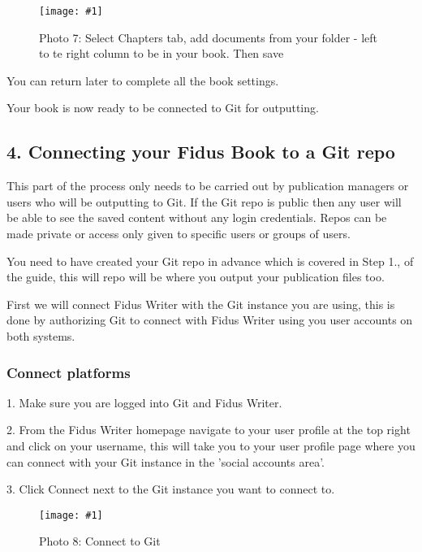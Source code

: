 \documentclass{article}
\newlength{\imgwidth}
\newcommand\scaledgraphics[2]{%
                
\settowidth{\imgwidth}{\texttt{[image: \#1]}}%
                
\setlength{\imgwidth}{\minof{\imgwidth}{#2\textwidth}}%
                
\texttt{[image: \#1]}%
                
}
\begin{document}
\begin{figure}
\scaledgraphics{a78ac1eb-85d0-4bf2-b732-94be1691dd6a.png}{1}
\caption*{Photo 7: Select Chapters tab, add documents from your folder - left to te right column to be in your book. Then save}\label{F16811081}
\end{figure}


You can return later to complete all the book settings.


Your book is now ready to be connected to Git for outputting.


\subsection{4. Connecting your Fidus Book to a Git repo}\label{H8269040}



This part of the process only needs to be carried out by publication managers or users who will be outputting to Git. If the Git repo is public then any user will be able to see the saved content without any login credentials. Repos can be made private or access only given to specific users or groups of users.


You need to have created your Git repo in advance which is covered in Step 1., of the guide, this will repo will be where you output your publication files too.


First we will connect Fidus Writer with the Git instance you are using, this is done by authorizing Git to connect with Fidus Writer using you user accounts on both systems.


\subsubsection{Connect platforms}\label{H5660938}



1. Make sure you are logged into Git and Fidus Writer.


2. From the Fidus Writer homepage navigate to your user profile at the top right and click on your username, this will take you to your user profile page where you can connect with your Git instance in the 'social accounts area'.


3. Click Connect next to the Git instance you want to connect to.

\begin{figure}
\scaledgraphics{2254c214-1e83-4452-9c22-9ff847136c1c.png}{1}
\caption*{Photo 8: Connect to Git}\label{F41047411}
\end{figure}
\end{document}
